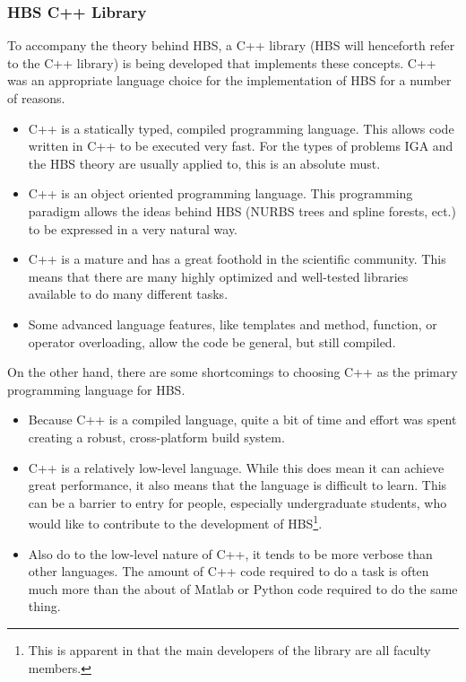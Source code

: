     \subsubsection{HBS C++ Library} \label{ssub:hbs_cpp_library}

    To accompany the theory behind HBS, a C++ library (HBS will henceforth refer to the C++ library) is being developed that implements these concepts. C++ was an appropriate language choice for the implementation of HBS for a number of reasons.

    \begin{itemize}
      \item C++ is a statically typed, compiled programming language. This allows code written in C++ to be executed very fast. For the types of problems IGA and the HBS theory are usually applied to, this is an absolute must.
      \item C++ is an object oriented programming language. This programming paradigm allows the ideas behind HBS (NURBS trees and spline forests, ect.) to be expressed in a very natural way.
      \item C++ is a mature and has a great foothold in the scientific community. This means that there are many highly optimized and well-tested libraries available to do many different tasks.
      \item Some advanced language features, like templates and method, function, or operator overloading, allow the code be general, but still compiled.
    \end{itemize}
    \mainstretch{}

    On the other hand, there are some shortcomings to choosing C++ as the primary programming language for HBS.

    \begin{itemize}
      \item Because C++ is a compiled language, quite a bit of time and effort was spent creating a robust, cross-platform build system.
      \item  C++ is a relatively low-level language. While this does mean it can achieve great performance, it also means that the language is difficult to learn. This can be a barrier to entry for people, especially undergraduate students, who would like to contribute to the development of HBS\footnote{This is apparent in that the main developers of the library are all faculty members.}.
      \item Also do to the low-level nature of C++, it tends to be more verbose than other languages. The amount of C++ code required to do a task is often much more than the about of Matlab or Python code required to do the same thing.
    \end{itemize}
    \mainstretch{}

